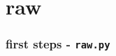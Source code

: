 %

\section{raw}

\begin{frame}[fragile]
  \frametitle{first steps - {\tt raw.py}}
  \begin{center}
  \end{center}
\end{frame}

